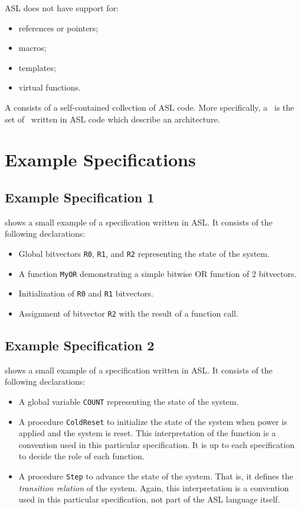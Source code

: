 ASL does not have support for:
\begin{itemize}
    \item references or pointers;
    \item macros;
    \item templates;
    \item virtual functions.
\end{itemize}

A \emph{\specificationterm} consists of a self-contained collection of ASL code.
More specifically, a \specificationterm\ is the set of \globaldeclarationsterm\
written in ASL code which describe an architecture.

\section{Example Specifications}

\subsection{Example Specification 1}
 shows a small example of a specification written in ASL. It consists of the following declarations:
\begin{itemize}
    \item Global bitvectors \texttt{R0}, \texttt{R1}, and \texttt{R2} representing the state of the system.
    \item A function \texttt{MyOR} demonstrating a simple bitwise OR function of 2 bitvectors.
    \item Initialization of \texttt{R0} and \texttt{R1} bitvectors.
    \item Assignment of bitvector \texttt{R2} with the result of a function call.
\end{itemize}

\begin{center}

\end{center}

\subsection{Example Specification 2}
 shows a small example of a specification written in ASL. It consists of the following declarations:
\begin{itemize}
\item A global variable \texttt{COUNT} representing the state of the system.
\item A procedure \texttt{ColdReset} to initialize the state of the system when power is applied and the system is reset.
    This interpretation of the function is a convention used in this particular specification. It is up to each
    specification to decide the role of each function.
\item A procedure \texttt{Step} to advance the state of the system. That is, it defines the \emph{transition relation} of the system.
    Again, this interpretation is a convention used in this particular specification, not part of the ASL language
    itself.
\end{itemize}

